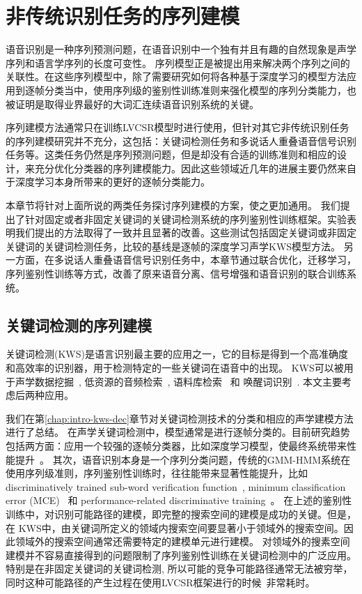 

\chapter{非传统识别任务的序列建模}
\label{chap:seqtrain}

语音识别是一种序列预测问题，在语音识别中一个独有并且有趣的自然现象是声学序列和语言学序列的长度可变性。
序列模型正是被提出用来解决两个序列之间的关联性。在这些序列模型中，除了需要研究如何将各种基于深度学习的模型方法应用到逐帧分类当中，使用序列级的鉴别性训练准则来强化模型的序列分类能力，也被证明是取得业界最好的大词汇连续语音识别系统的关键。


序列建模方法通常只在训练LVCSR模型时进行使用，但针对其它非传统识别任务的序列建模研究并不充分，这包括：关键词检测任务和多说话人重叠语音信号识别任务等。这类任务仍然是序列预测问题，但是却没有合适的训练准则和相应的设计，来充分优化分类器的序列建模能力。因此这些领域近几年的进展主要仍然来自于深度学习本身所带来的更好的逐帧分类能力。

本章节将针对上面所说的两类任务探讨序列建模的方案，使之更加通用。
我们提出了针对固定或者非固定关键词的关键词检测系统的序列鉴别性训练框架。实验表明我们提出的方法取得了一致并且显著的改善。这些测试包括固定关键词或非固定关键词的关键词检测任务，比较的基线是逐帧的深度学习声学KWS模型方法。
%
另一方面，在多说话人重叠语音信号识别任务中，本章节通过联合优化，迁移学习，序列鉴别性训练等方式，改善了原来语音分离、信号增强和语音识别的联合训练系统。


\section{关键词检测的序列建模}
\label{chap:kws}


关键词检测(KWS)是语言识别最主要的应用之一，它的目标是得到一个高准确度和高效率的识别器，用于检测特定的一些关键词在语音中的出现。
KWS可以被用于声学数据挖掘~\cite{zhou2005data}, 低资源的音频检索~\cite{shen2009comparison}, 
语料库检索~\cite{garofolo2000trec} 和 唤醒词识别~\cite{chen2014small}. 本文主要考虑后两种应用。

我们在第\ref{chap:intro-kws-dec}章节对关键词检测技术的分类和相应的声学建模方法进行了总结。
%
在声学关键词检测中，模型通常是进行逐帧分类的。目前研究趋势包括两方面：应用一个较强的逐帧分类器，比如深度学习模型，使最终系统带来性能提升~\cite{chen2014small,sainath2015convolutional}。 其次，语音识别本身是一个序列分类问题，传统的GMM-HMM系统在使用序列级准则，序列鉴别性训练时，往往能带来显著性能提升，比如discriminatively trained sub-word verification function~\cite{sukkar1996vocabulary}, minimum classification error (MCE)~\cite{sandness2000keyword} 和 performance-related discriminative training~\cite{keshet2009discriminative}。
在上述的鉴别性训练中，对识别可能路径的建模，即完整的搜索空间的建模是成功的关键。但是，在 KWS中，由关键词所定义的领域内搜索空间要显著小于领域外的搜索空间。因此领域外的搜索空间通常还需要特定的建模单元进行建模。
对领域外的搜素空间建模并不容易直接得到的问题限制了序列鉴别性训练在关键词检测中的广泛应用。
特别是在非固定关键词的关键词检测, 所以可能的竞争可能路径通常无法被穷举，同时这种可能路径的产生过程在使用LVCSR框架进行的时候~\cite{povey2005discriminative}非常耗时。 

